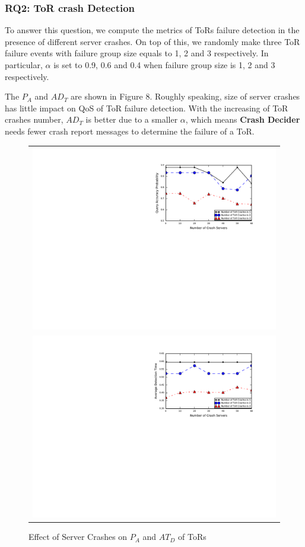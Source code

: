 \documentclass{sig-alternate-05-2015}
\begin{document}
\subsubsection*{RQ2: ToR crash Detection}
\quad To answer this question, we compute the metrics of ToRs failure detection in the presence of different server crashes. On top of this, we randomly make three ToR failure events with failure group size equals to 1, 2 and 3 respectively. In particular, $\alpha$ is set to 0.9, 0.6 and 0.4 when failure group size is 1, 2 and 3 respectively.

The $P_A$ and $AD_T$ are shown in Figure 8. Roughly speaking, size of server crashes has little impact on QoS of ToR failure detection. With the increasing of ToR crashes number, $AD_T$ is better due to a smaller $\alpha$, which means \textbf{Crash Decider} needs fewer crash report messages to determine the failure of a ToR.  

\begin{figure}
  \centering
  \begin{tabular}{c}
  \includegraphics[scale=0.7]{tor-r1} \\
  \includegraphics[scale=0.7]{tor-r2} \\
  \end{tabular}
  \caption{Effect of Server Crashes on $P_A$ and $AT_D$ of ToRs}
\end{figure}
\end{document}
